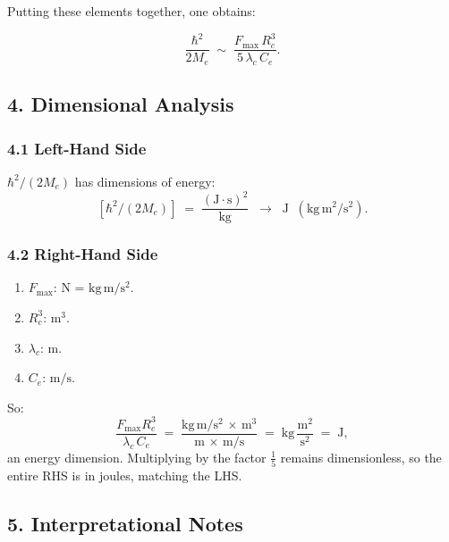 Putting these elements together, one obtains:

\[
    \frac{\hbar^2}{2M_e}
    \;\sim\;
    \frac{F_{\max} \,R_c^3}{5 \,\lambda_c \,C_e}.
\]

\subsection*{4. Dimensional Analysis}

\subsubsection*{4.1 Left-Hand Side}
\(\hbar^2/(2 M_e)\) has dimensions of energy:
\[
    [\hbar^2/(2 M_e)]
    \;=\;
    \frac{(\mathrm{J\cdot s})^2}{\mathrm{kg}}
    \;\;\rightarrow\;\;
    \mathrm{J} \;\;(\mathrm{kg\,m^2/s^2}).
\]

\subsubsection*{4.2 Right-Hand Side}
\begin{enumerate}
    \item \(F_{\max}\): \(\mathrm{N}\) = \(\mathrm{kg\,m/s^2}\).
    \item \(R_c^3\): \(\mathrm{m^3}\).
    \item \(\lambda_c\): \(\mathrm{m}\).
    \item \(C_e\): \(\mathrm{m/s}\).
\end{enumerate}

So:
\[
    \frac{F_{\max} R_c^3}{\lambda_c\,C_e}
    \;=\;
    \frac{\mathrm{kg\,m/s^2}\,\times\,\mathrm{m^3}}{\mathrm{m}\,\times\,\mathrm{m/s}}
    \;=\;
    \mathrm{kg}\,\frac{\mathrm{m^2}}{\mathrm{s^2}}
    \;=\;
    \mathrm{J},
\]
an energy dimension. Multiplying by the factor \(\tfrac{1}{5}\) remains dimensionless, so the entire RHS is in joules, matching the LHS.

\subsection*{5. Interpretational Notes}

